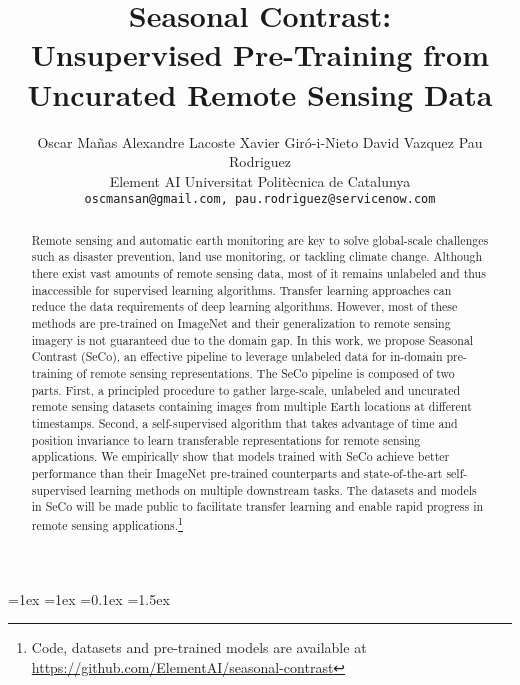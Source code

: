 \documentclass[10pt,twocolumn,letterpaper]{article}
\newcommand{\Methodname}[0]{Seasonal Contrast}
\newcommand{\methodname}[0]{SeCo}
\begin{document}
\iftrue
\abovecaptionskip=1ex           \belowcaptionskip=1ex           \intextsep=0.1ex         \textfloatsep=1.5ex      \fi



\title{\Methodname{}:\\ Unsupervised Pre-Training from Uncurated Remote Sensing Data}

\author{Oscar Mañas \quad Alexandre Lacoste \quad Xavier Giró-i-Nieto \quad David Vazquez \quad Pau Rodriguez\\
\small Element AI \quad \quad Universitat Politècnica de Catalunya\\
{\tt\small oscmansan@gmail.com, pau.rodriguez@servicenow.com}
}

\maketitle
\ificcvfinal\thispagestyle{empty}\fi

\begin{abstract}
   Remote sensing and automatic earth monitoring are key to solve global-scale challenges such as disaster prevention, land use monitoring, or tackling climate change. Although there exist vast amounts of remote sensing data, most of it remains unlabeled and thus inaccessible for supervised learning algorithms. Transfer learning approaches can reduce the data requirements of deep learning algorithms.  However, most of these methods are pre-trained on ImageNet and their generalization to remote sensing imagery is not guaranteed due to the domain gap. In this work, we propose \Methodname{} (\methodname{}), an effective pipeline to leverage unlabeled data for in-domain pre-training of remote sensing representations. The \methodname{} pipeline is composed of two parts. First, a principled procedure to gather large-scale, unlabeled and uncurated remote sensing datasets containing images from multiple Earth locations at different timestamps. Second, a self-supervised algorithm that takes advantage of time and position invariance to learn transferable representations for remote sensing applications. We empirically show that models trained with \methodname{} achieve better performance than their ImageNet pre-trained counterparts and state-of-the-art self-supervised learning methods on multiple downstream tasks. The datasets and models in \methodname{} will be made public to facilitate transfer learning and enable rapid progress in remote sensing applications.\footnote{Code, datasets and pre-trained models are available at \url{https://github.com/ElementAI/seasonal-contrast}}
\end{abstract}
\end{document}

